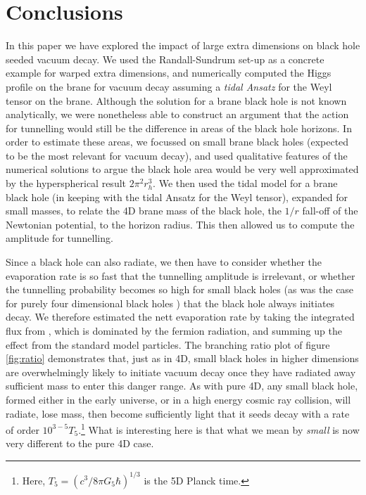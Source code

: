 \documentclass[aps,12pt,prd,superscriptaddress,preprintnumbers, 
	amssymb,
	amsmath,
	notitlepage,
	longbibliography,
	nofootinbib]{revtex4-1}
\begin{document}
\section{Conclusions}
\label{sec:disc}

In this paper we have explored the impact of large extra dimensions
on black hole seeded vacuum decay. We used the Randall-Sundrum
set-up as a concrete example for warped extra dimensions, and 
numerically computed the Higgs profile on the brane for vacuum decay
assuming a \emph{tidal Ansatz} for the Weyl tensor on the brane. 
Although the solution for a brane black hole is not known analytically, we 
were nonetheless able to construct an argument that the action for tunnelling
would still be the difference in areas of the black hole horizons. In order
to estimate these areas, we focussed on small brane black holes (expected
to be the most relevant for vacuum decay), and used qualitative features of
the numerical solutions to argue the black hole area would be very well 
approximated by the hyperspherical result $2\pi^2r_h^3$. We then used the
tidal model for a brane black hole (in keeping with the tidal Ansatz for the 
Weyl tensor), expanded for small masses, to relate the 4D brane mass of the
black hole, the $1/r$ fall-off of the Newtonian potential, to the horizon radius.
This then allowed us to compute the amplitude for tunnelling.

Since a black hole can also radiate, we then have to consider whether
the evaporation rate is so fast that the tunnelling amplitude is irrelevant,
or whether the tunnelling probability becomes so high for small black holes
(as was the case for purely four dimensional black holes \cite{BGM3}) that
the black hole always initiates decay. We therefore estimated the nett
evaporation rate by taking the integrated flux from \cite{Harris:2003eg},
which is dominated by the fermion radiation, and summing up the effect
from the standard model particles. The branching ratio plot of figure \ref{fig:ratio}
demonstrates that, just as in 4D, small black holes in higher dimensions
are overwhelmingly likely to initiate vacuum decay once they have 
radiated away sufficient mass to enter this danger range. As with pure 4D,
any small black hole, formed either in the early universe, or in a high energy
cosmic ray collision, will radiate, lose mass, then become sufficiently light
that it seeds decay with a rate of order $10^{3-5} T_5$.\footnote{Here,
$T_5 = (c^3/8\pi G_5 \hbar)^{1/3}$ is the 5D Planck time.} What is interesting
here is that what we mean by \emph{small} is now very different to the
pure 4D case.
\end{document}
